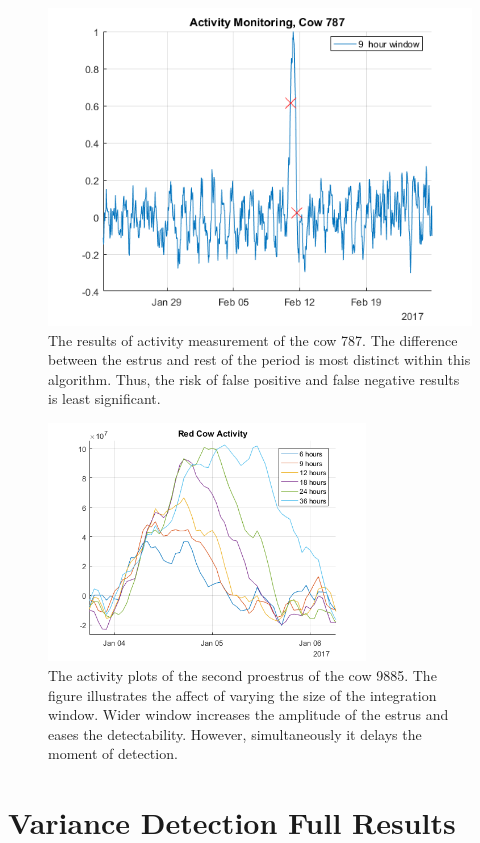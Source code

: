 \begin{figure}[h]
\centering
\includegraphics[width = 0.75 \textwidth]{figures/ActivityMonitoringCow787.png}
\caption{The results of activity measurement of the cow 787. The difference between the estrus and rest of the period is most distinct within this algorithm. Thus, the risk of false positive and false negative results is least significant.}
\label{ActivityMonitoringCow787}
\end{figure}

\begin{figure}[h]
\centering
\includegraphics[width = 0.75\textwidth]{figures/redcowactivity2.png}
\caption{The activity plots of the second proestrus of the cow 9885. The figure illustrates the affect of varying the size of the integration window. Wider window increases the amplitude of the estrus and eases the detectability. However, simultaneously it delays the moment of detection. }
\label{integrationwindows}
\end{figure}

\clearpage
\section{Variance Detection Full Results}

